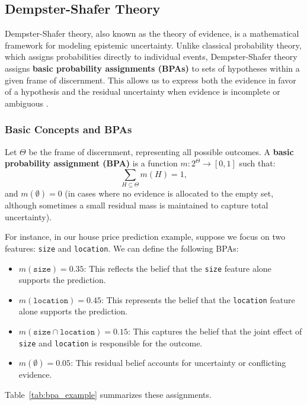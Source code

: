 \documentclass[acmlarge]{acmart}
\begin{document}
\subsection{Dempster-Shafer Theory}

Dempster-Shafer theory, also known as the theory of evidence, is a mathematical framework for modeling epistemic uncertainty. Unlike classical probability theory, which assigns probabilities directly to individual events, Dempster-Shafer theory assigns \textbf{basic probability assignments (BPAs)} to sets of hypotheses within a given frame of discernment. This allows us to express both the evidence in favor of a hypothesis and the residual uncertainty when evidence is incomplete or ambiguous \cite{shafer1976mathematical}.

\subsubsection{Basic Concepts and BPAs}

Let \(\Theta\) be the frame of discernment, representing all possible outcomes. A \textbf{basic probability assignment (BPA)} is a function \( m: 2^{\Theta} \rightarrow [0,1] \) such that:
\[
\sum_{H \subseteq \Theta} m(H) = 1,
\]
and \( m(\emptyset) = 0 \) (in cases where no evidence is allocated to the empty set, although sometimes a small residual mass is maintained to capture total uncertainty).

For instance, in our house price prediction example, suppose we focus on two features: \texttt{size} and \texttt{location}. We can define the following BPAs:
\begin{itemize}
    \item \( m(\texttt{size}) = 0.35 \): This reflects the belief that the \texttt{size} feature alone supports the prediction.
    \item \( m(\texttt{location}) = 0.45 \): This represents the belief that the \texttt{location} feature alone supports the prediction.
    \item \( m(\texttt{size} \cap \texttt{location}) = 0.15 \): This captures the belief that the joint effect of \texttt{size} and \texttt{location} is responsible for the outcome.
    \item \( m(\emptyset) = 0.05 \): This residual belief accounts for uncertainty or conflicting evidence.
\end{itemize}

Table~\ref{tab:bpa_example} summarizes these assignments.
\end{document}
